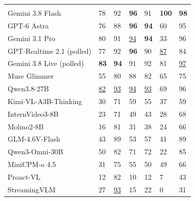 \begingroup
\setlength{\tabcolsep}{0pt}
\renewcommand{\arraystretch}{1.02}
\fontsize{8.6}{10.7}\selectfont
\begin{tabular}{@{}L{.28\linewidth}K{ivgscreen}{.10\linewidth}K{ivgquality}{.124\linewidth}K{ivgquality}{.124\linewidth}K{ivgquality}{.124\linewidth}K{ivgquality}{.124\linewidth}K{ivgquality}{.124\linewidth}@{}}
\toprule
{} &  &  &  &  &  & \\
Gemini 3.8 Flash & 78 & 92 & \textbf{96} & 91 & \textbf{100} & \textbf{98}\\
GPT-6 Astra & 76 & 88 & \textbf{96} & \textbf{94} & 60 & 95\\
Gemini 3.1 Pro & 80 & 91 & \underline{94} & \textbf{94} & 33 & 96\\
GPT-Realtime 2.1 (polled) & 77 & 92 & \textbf{96} & 90 & \underline{87} & 84\\
Gemini 3.8 Live (polled) & \textbf{83} & \textbf{94} & 91 & 92 & 81 & \underline{97}\\
Muse Glimmer & 55 & 80 & 88 & 82 & 65 & 75\\
Qwen3.8-27B & \underline{82} & \underline{93} & \underline{94} & \underline{93} & 69 & 96\\
Kimi-VL-A3B-Thinking & 30 & 71 & 59 & 55 & 37 & 59\\
InternVideo3-8B & 23 & 71 & 49 & 43 & 28 & 68\\
Molmo2-8B & 16 & 81 & 31 & 38 & 24 & 66\\
GLM-4.6V-Flash & 43 & 89 & 53 & 57 & 41 & 89\\
Qwen3-Omni-30B & 50 & 82 & 71 & 72 & 22 & 85\\
MiniCPM-o 4.5 & 31 & 75 & 55 & 50 & 49 & 66\\
Proact-VL & 12 & 82 & 10 & 12 & 7 & 43\\
StreamingVLM & 27 & \underline{93} & 15 & 22 & 0 & 31\\
\bottomrule
\end{tabular}\par
\endgroup
{}
